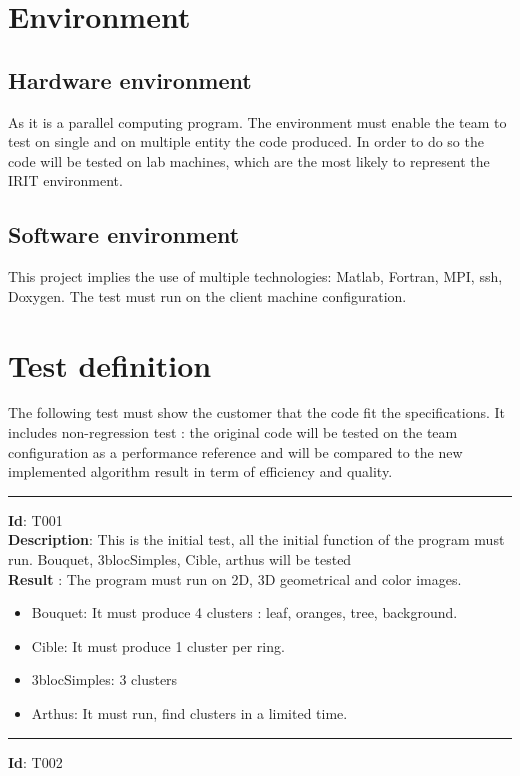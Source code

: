 \section{Environment}
\subsection{Hardware environment}
As it is a parallel computing program. The environment must enable the team to test on single and on multiple entity the code produced. In order to do so the code will be tested on lab machines, which are the most likely to represent the IRIT environment. 
\subsection{Software environment}
This project implies the use of multiple technologies: Matlab, Fortran, MPI, ssh, Doxygen. The test must run on the client machine configuration.

\section{Test definition}
The following test must show the customer that the code fit the specifications. It includes non-regression test : the original code will be tested on the team configuration as a performance reference and will be compared to the new implemented algorithm result in term of efficiency and quality.\\

\hrule
\vspace{0.2cm}
\noindent
\textbf{Id}: T001\\

\textbf{Description}: This is the initial test, all the initial function of the program must run. Bouquet, 3blocSimples, Cible, arthus will be tested\\

\textbf{Result} : The program must run on 2D, 3D geometrical and color images.
\begin{itemize}
\item Bouquet: It must produce 4 clusters : leaf, oranges, tree, background.
\item Cible: It must produce 1 cluster per ring.
\item 3blocSimples: 3 clusters
\item Arthus: It must run, find clusters in a limited time.\\
\end{itemize}
\hrule
\vspace{0.2cm}
\textbf{Id}: T002\\

